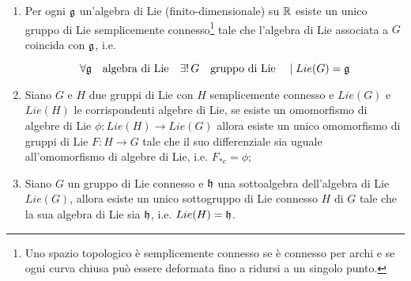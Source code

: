 \begin{theorem}\hfill\break
	\begin{enumerate}
		\item Per ogni $ \mathfrak{g} $ un'algebra di Lie (finito-dimensionale) su $ \mathbb{R} $ esiste un unico gruppo di Lie semplicemente connesso\footnote{%
			Uno spazio topologico è semplicemente connesso se è connesso per archi e se ogni curva chiusa può essere deformata fino a ridursi a un singolo punto.%
		} tale che l'algebra di Lie associata a $ G $ coincida con $ \mathfrak{g} $, i.e.
		
		\begin{equation}
			\forall \g \qq{algebra di Lie} \exists ! \, G \qq{gruppo di Lie} \mid Lie(G) = \g
		\end{equation}
	
		\item Siano $ G $ e $ H $ due gruppi di Lie con $ H $ semplicemente connesso e $ Lie(G) $ e $ Lie(H) $ le corrispondenti algebre di Lie, se esiste un omomorfismo di algebre di Lie $ \phi : Lie(H) \to Lie(G) $ allora esiste un unico omomorfismo di gruppi di Lie $ F : H \to G $ tale che il suo differenziale sia uguale all'omomorfismo di algebre di Lie, i.e. $ F_{*e} = \phi $;
		
		\item Siano $ G $ un gruppo di Lie connesso e $ \mathfrak{h} $ una sottoalgebra dell'algebra di Lie $ Lie(G) $, allora esiste un unico sottogruppo di Lie connesso $ H $ di $ G $ tale che la sua algebra di Lie sia $ \mathfrak{h} $, i.e. $ Lie(H) = \mathfrak{h} $.
	\end{enumerate}
\end{theorem}

